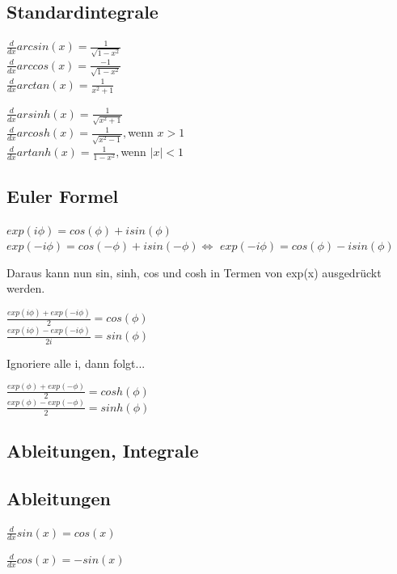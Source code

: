 \subsection{Standardintegrale}
\begin{minipage}{0.49\linewidth}
$\frac{d}{dx} arcsin(x) = \frac{1}{\sqrt{1-x^2}}$ \\
$\frac{d}{dx} arccos(x) = \frac{-1}{\sqrt{1-x^2}}$ \\
$\frac{d}{dx} arctan(x) =\frac {1}{x^2+1}$ \\
\end{minipage}
\begin{minipage}{0.49\linewidth}
$\frac{d}{dx} arsinh(x) =\frac{1}{\sqrt{x^2+1}}$ \\
$\frac{d}{dx} arcosh(x) =\frac{1}{\sqrt{x^2-1}}, $wenn $ x>1$ \\
$\frac{d}{dx} artanh(x) =\frac{1}{1-x^2}, $wenn $ |x|<1$ \\
\end{minipage}

\subsection{Euler Formel}
$exp(i \phi) = cos(\phi) + isin(\phi)$
\\
$exp(-i \phi) = cos(-\phi) + isin(-\phi) \Longleftrightarrow $ 
$exp(-i \phi) = cos(\phi) - isin(\phi)$ 

Daraus kann nun sin, sinh, cos und cosh in Termen von exp(x) ausgedrückt werden.

$\frac{exp(i \phi) + exp(-i \phi)}{2}  = cos(\phi)$\\
$\frac{exp(i \phi) - exp(-i \phi)}{2i}  = sin(\phi)$

Ignoriere alle i, dann folgt...

$\frac{exp(\phi) + exp(-\phi)}{2}  = cosh(\phi)$\\
$\frac{exp(\phi) - exp(-\phi)}{2}  = sinh(\phi)$




\subsection{Ableitungen, Integrale}
\subsection{Ableitungen}
$\frac{d}{dx}sin(x) = cos(x)$

$\frac{d}{dx}cos(x) = -sin(x)$

